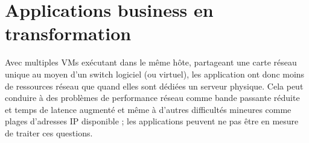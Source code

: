 \section{Applications business en transformation}

Avec multiples VMs exécutant dans le même hôte, partageant une carte réseau unique au moyen d'un switch logiciel (ou virtuel), les application ont donc moins de ressources réseau que quand elles sont dédiées un serveur physique. Cela peut conduire à des problèmes de performance réseau comme bande passante réduite et temps de latence augmenté et même à d'autres difficultés mineures comme plages d'adresses IP disponible ; les applications peuvent ne pas être en mesure de traiter ces questions.




